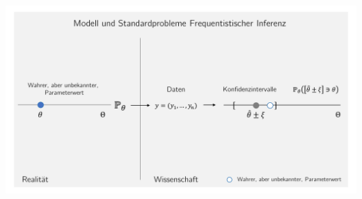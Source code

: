 \documentclass[
  8pt,
  ignorenonframetext,
]{beamer}
\begin{document}
\begin{frame}{}
\protect\hypertarget{section-3}{}
\begin{center}\includegraphics[width=1\linewidth]{11_Abbildungen/wtfi_11_frequentistische_inferenz_konfidenzintervalle} \end{center}
\end{frame}
\end{document}
